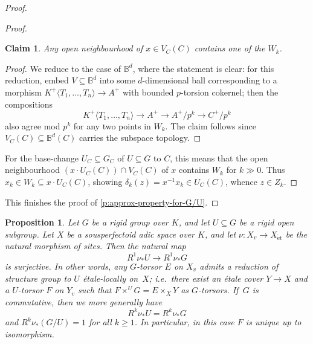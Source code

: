 \documentclass[10pt,a4paper]{article}
\newtheorem{Proposition}[thm]{Proposition}
\newtheorem{Claim}[thm]{Claim}
\theoremstyle{definition}
\theoremstyle{remark}
\newcommand{\lra}{\longrightarrow}
\newcommand{\B}{\mathbb{B}}
\newcommand{\et}{{\operatorname{\acute{e}t}}}
\numberwithin{equation}{section}
\begin{document}
\begin{proof}
\begin{proof}
		\begin{Claim}
		Any open neighbourhood of $x\in V_C(C)$ contains one of the $W_k$.
		\end{Claim}

                \begin{proof}
		 We reduce to the case of $\B^d$, where the statement is clear: for this reduction, embed $V\subseteq \B^d$ into some $d$-dimensional ball corresponding to a morphism 
		 $K^+\langle T_1,\dots,T_n\rangle\to A^+$ with bounded $p$-torsion cokernel; then  the compositions 
		 \[K^+\langle T_1,\dots,T_n\rangle\lra A^+\lra A^+/p^k\lra C^+/p^k\] also agree mod $p^k$ for any two points in $W_k$. The claim follows since $V_C(C)\subseteq \B^d(C)$ carries the subspace topology.
		\end{proof}
                
		For the base-change $U_C\subseteq G_C$ of $U\subseteq G$ to $C$, this means that the open neighbourhood $(x\cdot U_C(C))\cap V_C(C)$ of $x$ contains  $W_k$ for $k\gg 0$. Thus $x_k\in W_k\subseteq  x\cdot U_C(C)$, showing $\delta_k(z)=x^{-1}x_k\in U_C(C)$, whence $z\in Z_k$.
	\end{proof}
        
This finishes the proof of \cref{p:approx-property-for-G/U}.
\end{proof}

\begin{Proposition}\label{p:reduction-of-structure-group-to-open-subgroup}
	Let $G$ be a rigid group over $K$, and let $U\subseteq G$ be a rigid open subgroup. Let $X$ be a sousperfectoid adic space over $K$, and let $\nu\colon X_v\to X_{\et}$ be the natural morphism of sites. Then the natural map
	\[ R^1\nu_{\ast}U\lra R^1\nu_{\ast}G\]
	is surjective. In other words, any $G$-torsor $E$ on $X_v$ admits a reduction of structure group to $U$ \'etale-locally on~$X$; \textit{i.e.}~there exist an \'etale cover $Y\to X$ and a $U$-torsor $F$ on $Y_v$ such that $F\times^UG=E\times_XY$ as $G$-torsors. If\, $G$ is commutative, then we more generally have 
	\[R^k\nu_{\ast}U= R^k\nu_{\ast}G\]
	and $R^k\nu_{\ast}(G/U)=1$ for all $k\geq 1$. In particular, in this case $F$ is unique up to isomorphism.
\end{Proposition}
\end{document}
